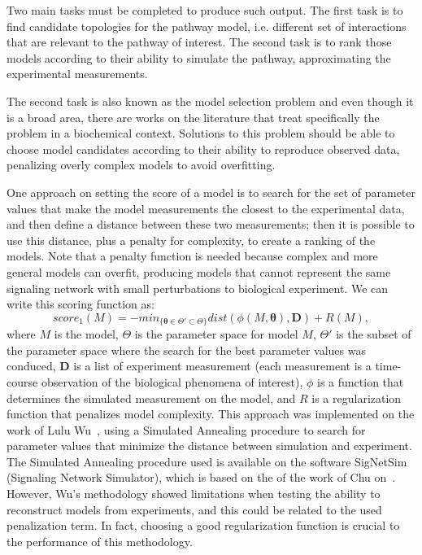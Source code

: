 Two main tasks must be completed to produce such output. The first task
is to find candidate topologies for the pathway model, i.e. different
set of interactions that are relevant to the pathway of interest. The
second task is to rank those models according to their ability to 
simulate the pathway, approximating the experimental measurements.


The second task is also known as the model selection problem and even
though it is a broad area, there are works on the literature that treat 
specifically the problem in a biochemical context. Solutions to this 
problem should be able to choose model candidates according to their 
ability to reproduce observed data, penalizing overly complex models 
to avoid overfitting. 

One approach on setting the score of a model is to search for the set of 
parameter values that make the model measurements the closest to the 
experimental data, and then define a distance between these two 
measurements; then it is possible to use this distance, plus a penalty 
for complexity, to create a ranking of the models. Note that a penalty 
function is needed because complex and more general models can overfit,
producing models that cannot represent the same signaling network with
small perturbations to biological experiment. We can write this scoring 
function as:
\begin{equation*}
    score_1 (M) = - min_{\{{\boldsymbol \theta} \in \Theta' \subset
        \Theta\}} dist (\phi(M, {\bm \theta}), {\bm D}) + R (M),
\end{equation*}
where $M$ is the model, $\Theta$ is the parameter space for model $M$, 
$\Theta'$ is the subset of the parameter space where the search for the
best parameter values was conduced, ${\bm D}$ is a list of experiment
measurement (each measurement is a time-course observation of the
biological phenomena of interest), $\phi$ is a function that determines
the simulated measurement on the model, and $R$ is a regularization
function that penalizes model complexity. This approach was implemented
on the work of Lulu Wu~\cite{Wu15}, using a Simulated Annealing
procedure to search for parameter values that minimize the distance
between simulation and experiment. The Simulated Annealing procedure
used is available on the software SigNetSim (Signaling Network
Simulator), which is based on the of the work of Chu on~\cite{Chu1999}.
However, Wu's methodology showed limitations when testing the ability to
reconstruct models from experiments, and this could be related to the
used penalization term. In fact, choosing a good regularization function
is crucial to the performance of this methodology.

